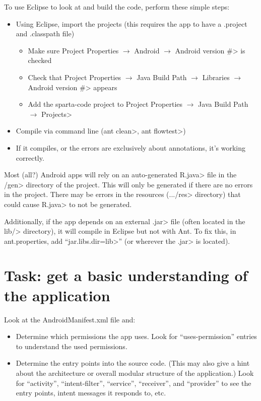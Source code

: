 To use Eclipse to look at and build the code, perform these simple
steps:
\begin{itemize}
\item
Using Eclipse, import the projects (this requires the app to have a
.project and .classpath file)
  \begin{itemize}
    \item
    Make sure
    \<Project Properties $\rightarrow$ Android $\rightarrow$ Android
    version \#> is checked

    \item
    Check that
    \<Project Properties $\rightarrow$ Java Build Path $\rightarrow$
    Libraries $\rightarrow$ Android version \#> appears

    \item
    Add the sparta-code project to
    \<Project Properties $\rightarrow$ Java Build Path $\rightarrow$ Projects>
  \end{itemize}

\item Compile via command line (\<ant clean>, \<ant flowtest>)

\item If it compiles, or the errors are exclusively about annotations,
  it's working correctly.
\end{itemize}

Most (all?) Android apps will rely on an auto-generated \<R.java> file
in the \</gen> directory of the project. This will only be generated
if there are no errors in the project. There may be errors in the
resources (\<.../res> directory) that could cause \<R.java> to not be
generated.

Additionally, if the app depends on an external \<.jar> file (often
located in the \<lib/> directory), it will compile in Eclipse but not
with Ant. To fix this, in ant.properties, add ``\<jar.libs.dir=lib>''
(or wherever the \<.jar> is located).


\section{Task: get a basic understanding of the application}

Look at the AndroidManifest.xml file and:
\begin{itemize}
\item Determine which permissions the app uses.
  Look for ``uses-permission'' entries to understand the used
  permissions.
\item Determine the entry points into the source code. (This may also give
  a hint about the architecture or overall modular structure of the
  application.)
  Look for ``activity'', ``intent-filter'', ``service'', ``receiver'', and
  ``provider'' to see the entry points, intent messages it responds to,
  etc.
\end{itemize}


